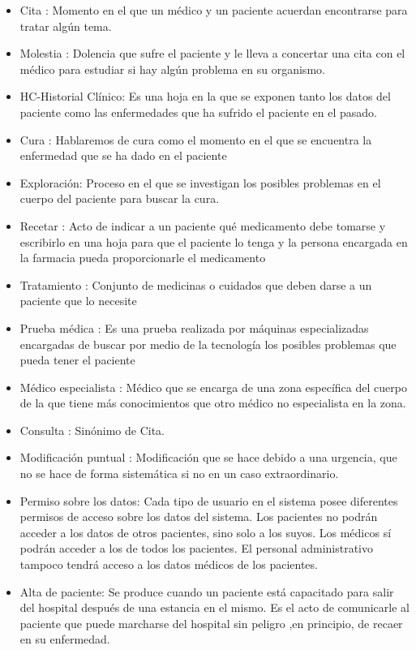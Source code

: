 \begin{itemize}
\item Cita : Momento en el que un médico y un paciente acuerdan encontrarse para tratar algún tema.
\item Molestia : Dolencia que sufre el paciente y le lleva a concertar una cita con el médico para estudiar si hay algún problema en su organismo.
\item HC-Historial Clínico: Es una hoja en la que se exponen tanto los datos del paciente como las enfermedades que ha sufrido el paciente en el pasado.
\item Cura : Hablaremos de cura como el momento en el que se encuentra la enfermedad que se ha dado en el paciente
\item Exploración: Proceso en el que se investigan los posibles problemas en el cuerpo del paciente para buscar la cura.
\item Recetar : Acto de indicar a un paciente qué medicamento debe tomarse y escribirlo en una hoja para que el paciente lo tenga y la persona encargada en la farmacia pueda proporcionarle el medicamento
\item Tratamiento : Conjunto de medicinas o cuidados que deben darse a un paciente que lo necesite

\item Prueba médica : Es una prueba realizada por máquinas especializadas encargadas de buscar por medio de la tecnología los posibles problemas que pueda tener el paciente

\item Médico especialista : Médico que se encarga de una zona específica del cuerpo de la que tiene más conocimientos que otro médico no especialista en la zona.

\item Consulta : Sinónimo de Cita.
\item Modificación puntual : Modificación que se hace debido a una urgencia, que no se hace de forma sistemática si no en un caso extraordinario.
\item Permiso sobre los datos: Cada tipo de usuario en el sistema posee diferentes permisos de acceso sobre los datos del sistema. Los pacientes no podrán acceder a los datos de otros pacientes, sino solo a los suyos. Los médicos sí podrán acceder a los de todos los pacientes. El personal administrativo tampoco tendrá acceso a los datos médicos de los pacientes.

\item Alta de paciente: Se produce cuando un paciente está capacitado para salir del hospital después de una estancia en el mismo. Es el acto de comunicarle al paciente que puede marcharse del hospital sin peligro ,en principio, de recaer en su enfermedad.


\end{itemize}
